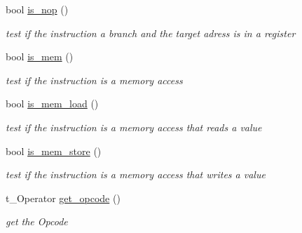 \begin{DoxyCompactItemize}
\item 
\mbox{\label{class_instruction_a2222ad40481088c12a38c5f340bcd86b}} 
bool \mbox{\hyperlink{class_instruction_a2222ad40481088c12a38c5f340bcd86b}{is\+\_\+nop}} ()
\begin{DoxyCompactList}\small\item\em test if the instruction a branch and the target adress is in a register \end{DoxyCompactList}\item 
\mbox{\label{class_instruction_a1c79865faf9baa4d70edf81e956d952d}} 
bool \mbox{\hyperlink{class_instruction_a1c79865faf9baa4d70edf81e956d952d}{is\+\_\+mem}} ()
\begin{DoxyCompactList}\small\item\em test if the instruction is a memory access \end{DoxyCompactList}\item 
\mbox{\label{class_instruction_aee32f4bb91480afc74375beb139af4d6}} 
bool \mbox{\hyperlink{class_instruction_aee32f4bb91480afc74375beb139af4d6}{is\+\_\+mem\+\_\+load}} ()
\begin{DoxyCompactList}\small\item\em test if the instruction is a memory access that reads a value \end{DoxyCompactList}\item 
\mbox{\label{class_instruction_a4455144397d239eb61bcfa2b0e16bf67}} 
bool \mbox{\hyperlink{class_instruction_a4455144397d239eb61bcfa2b0e16bf67}{is\+\_\+mem\+\_\+store}} ()
\begin{DoxyCompactList}\small\item\em test if the instruction is a memory access that writes a value \end{DoxyCompactList}\item 
\mbox{\label{class_instruction_a1195d03eb4ff6024b20cd2cec1c8a1e0}} 
t\+\_\+\+Operator \mbox{\hyperlink{class_instruction_a1195d03eb4ff6024b20cd2cec1c8a1e0}{get\+\_\+opcode}} ()
\begin{DoxyCompactList}\small\item\em get the Opcode \end{DoxyCompactList}\item 
\mbox{\label{class_instruction_aeba180e03a3ac7f7ecba7635d454566f}} 

\end{DoxyCompactItemize}
